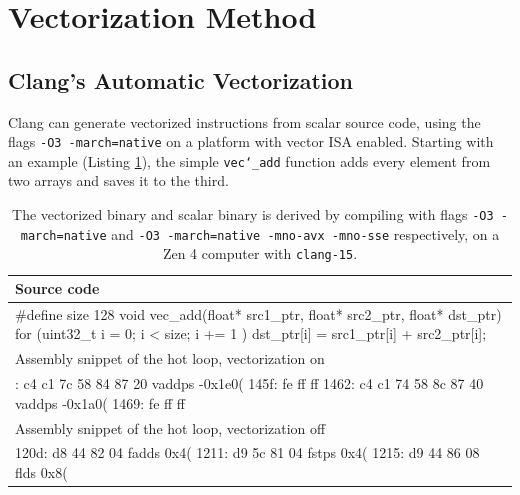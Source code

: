 \documentclass[logo,bsc,singlespacing,parskip]{infthesis}
\newenvironment{VerbatimCompact}
  {\vspace*{-2.5mm}\VerbatimEnvironment
   \par\Verbatim}
  {\endVerbatim\vspace*{-2.4mm}}
\begin{document}
\section{Vectorization Method}
\label{sec:vectorization-method}
\subsection{Clang's Automatic Vectorization}
Clang can generate vectorized instructions from scalar source code,
using the flags \texttt{-O3 -march=native} on a platform with vector ISA
enabled. Starting with an example (Listing \ref{vec-add-float-auto}), the simple
\texttt{vec\char`_add} function adds every element from two arrays and saves it to
the third. 

\begin{table}[ht]\captionsetup{name=Listing}
\begin{tabular}{>{\raggedright\arraybackslash}p{13cm}}
    Source code\\
    \midrule
    \begin{VerbatimCompact}
#define size 128
void vec_add(float* src1_ptr, float* src2_ptr, float* dst_ptr) {
    for (uint32_t i = 0; i < size; i += 1 ){
        dst_ptr[i] = src1_ptr[i] + src2_ptr[i];
    }
}
    \end{VerbatimCompact}
    \\

    Assembly snippet of the hot loop, vectorization on\\
    \midrule
    \begin{VerbatimCompact}
1458: c4 c1 7c 58 84 87 20 vaddps -0x1e0(%
145f: fe ff ff
1462: c4 c1 74 58 8c 87 40 vaddps -0x1a0(%
1469: fe ff ff
    \end{VerbatimCompact}
    \\
    Assembly snippet of the hot loop, vectorization off\\
    \midrule
    \begin{VerbatimCompact}
120d: d8 44 82 04    fadds  0x4(%
1211: d9 5c 81 04    fstps  0x4(%
1215: d9 44 86 08    flds   0x8(%
    \end{VerbatimCompact}
\end{tabular}
\caption{The vectorized binary and scalar binary is derived by compiling with flags
\texttt{-O3 -march=native} and \texttt{-O3 -march=native -mno-avx -mno-sse}
respectively, on a Zen 4 computer with \texttt{clang-15}.}
\label{vec-add-float-auto}
\end{table}
\end{document}
